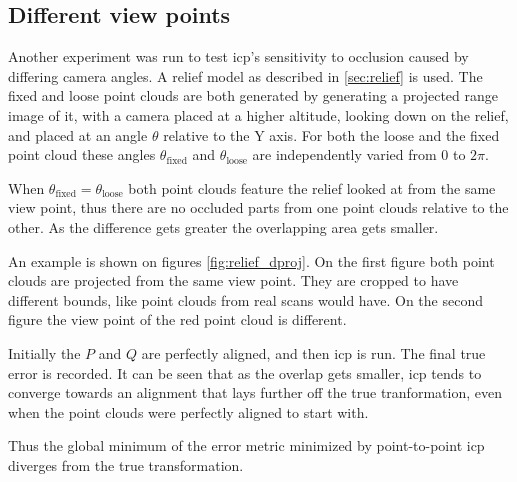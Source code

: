 \subsection{Different view points}
Another experiment was run to test \gls{icp}'s sensitivity to occlusion caused by differing camera angles. A relief model as described in \ref{sec:relief} is used. The fixed and loose point clouds are both generated by generating a projected range image of it, with a camera placed at a higher altitude, looking down on the relief, and placed at an angle $\theta$ relative to the Y axis. For both the loose and the fixed point cloud these angles $\theta_{\text{fixed}}$ and $\theta_{\text{loose}}$ are independently varied from $0$ to $2 \pi$.

When $\theta_{\text{fixed}} = \theta_{\text{loose}}$ both point clouds feature the relief looked at from the same view point, thus there are no occluded parts from one point clouds relative to the other. As the difference gets greater the overlapping area gets smaller.

An example is shown on figures \ref{fig:relief_dproj}. On the first figure both point clouds are projected from the same view point. They are cropped to have different bounds, like point clouds from real scans would have. On the second figure the view point of the red point cloud is different.

Initially the $P$ and $Q$ are perfectly aligned, and then \gls{icp} is run. The final true error is recorded. It can be seen that as the overlap gets smaller, \gls{icp} tends to converge towards an alignment that lays further off the true tranformation, even when the point clouds were perfectly aligned to start with.

Thus the global minimum of the error metric minimized by point-to-point \gls{icp} diverges from the true transformation.

